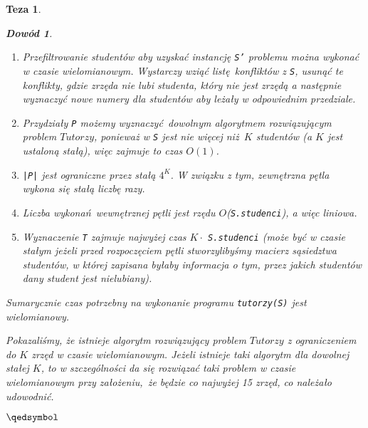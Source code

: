 \documentclass[12pt]{article}
\newtheorem*{theorem*}{Teza}
\newtheorem*{proof*}{Dowód}
\begin{document}
\begin{titlepage}
\begin{theorem*}
\begin{proof*}
\begin{enumerate}
    \item Przefiltrowanie studentów aby uzyskać instancję \texttt{S'} problemu 
    można wykonać w czasie wielomianowym. Wystarczy wziąć listę konfliktów z 
    \texttt{S}, usunąć te konflikty, gdzie zrzęda nie lubi studenta, który nie 
    jest zrzędą a następnie wyznaczyć nowe numery dla studentów aby leżały w 
    odpowiednim przedziale.
    \item Przydziały \texttt{P} możemy wyznaczyć dowolnym algorytmem 
    rozwiązującym problem $Tutorzy$, ponieważ w \texttt{S} jest nie więcej 
    niż $K$ studentów (a $K$ jest ustaloną stałą), więc zajmuje to czas $O(1)$.
    \item \texttt{|P|} jest ograniczne przez stałą $4^K$. W związku z tym, 
    zewnętrzna pętla wykona się stałą liczbę razy.
    \item Liczba wykonań wewnętrznej pętli jest rzędu $O$(\texttt{S.studenci}),
    a więc liniowa.
    \item Wyznaczenie \texttt{T} zajmuje najwyżej czas $K\cdot$ \texttt
    {S.studenci} (może być w czasie stałym jeżeli przed rozpoczęciem pętli 
    stworzylibyśmy macierz sąsiedztwa studentów, w której zapisana byłaby 
    informacja o tym, przez jakich studentów dany student jest nielubiany).
\end{enumerate}

Sumarycznie czas potrzebny na wykonanie programu \texttt{tutorzy(S)} jest 
wielomianowy.

$ $\\
Pokazaliśmy, że istnieje algorytm rozwiązujący problem $Tutorzy$ z 
ograniczeniem do $K$ zrzęd w czasie wielomianowym. Jeżeli istnieje taki 
algorytm dla dowolnej stałej $K$, to w szczególności da się rozwiązać taki 
problem w czasie wielomianowym przy założeniu, że będzie co najwyżej 15 zrzęd, 
co należało udowodnić.
\begin{flushright}
    $\qedsymbol$
\end{flushright}

\end{proof*} \end{theorem*}

\end{titlepage}
\end{document}
